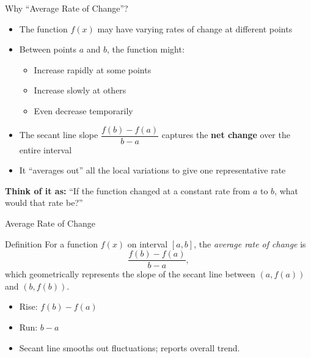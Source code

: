 \documentclass{beamer}
\begin{document}
\begin{frame}{Why ``Average Rate of Change''?}
  \begin{itemize}
    \item The function $f(x)$ may have varying rates of change at different points
    \item Between points $a$ and $b$, the function might:
    \begin{itemize}
      \item Increase rapidly at some points
      \item Increase slowly at others
      \item Even decrease temporarily
    \end{itemize}
    \item The secant line slope $\dfrac{f(b)-f(a)}{b-a}$ captures the \textbf{net change} over the entire interval
    \item It ``averages out'' all the local variations to give one representative rate
  \end{itemize}
  \vspace{1ex}
  \begin{center}
    \textbf{Think of it as:} ``If the function changed at a constant rate from $a$ to $b$, what would that rate be?''
  \end{center}
\end{frame}

\begin{frame}{Average Rate of Change}
  \begin{block}{Definition}
    For a function $f(x)$ on interval $[a,b]$, the \emph{average rate of change} is
    \[ 
      \frac{f(b)-f(a)}{b-a},
    \]
    which geometrically represents the slope of the secant line between $(a,f(a))$ and $(b,f(b))$.
  \end{block}
  \begin{itemize}
    \item Rise: $f(b)-f(a)$
    \item Run: $b-a$
    \item Secant line smooths out fluctuations; reports overall trend.
  \end{itemize}
\end{frame}
\end{document}
